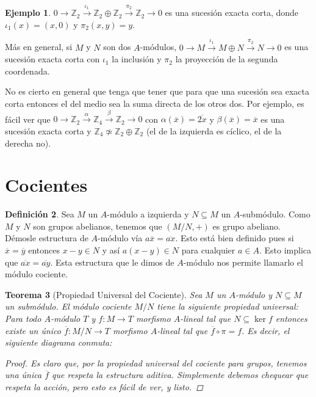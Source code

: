 \documentclass[12pt]{book}
\newtheorem{teo}{Teorema}[section]
\theoremstyle{definition}
\newtheorem{defn}[teo]{Definición}
\newtheorem{ex}[teo]{Ejemplo}
\newcommand{\ZZ}{\mathbb{Z}}      %
\begin{document}
\begin{ex}
$0\longrightarrow \ZZ_2 \stackrel{\iota_1}{\longrightarrow} \ZZ_2 \oplus \ZZ_2 \stackrel{\pi_2}{\longrightarrow} \ZZ_2\longrightarrow 0$ es una sucesión exacta corta, donde $\iota_1(x) = (x,0)$ y $\pi_2(x,y)=y$.

Más en general, si $M$ y $N$ son dos $A$-módulos, $0\longrightarrow M\stackrel{\iota_1}{\longrightarrow} M\oplus N\stackrel{\pi_2}{\longrightarrow} N\longrightarrow 0$ es una sucesión exacta corta con $\iota_1$ la inclusión y $\pi_2$ la proyección de la segunda coordenada.

No es cierto en general que tenga que tener que para que una sucesión sea exacta corta entonces el del medio sea la suma directa de los otros dos. Por ejemplo, es fácil ver que $0\longrightarrow \ZZ_2\stackrel{\alpha}{\longrightarrow} \ZZ_4 \stackrel{\beta}{\longrightarrow} \ZZ_2\longrightarrow 0$ con $\alpha(\overline{x})=\overline{2x}$ y $\beta(\overline{x})=\overline{x}$ es una sucesión exacta corta y $\ZZ_4\not\simeq \ZZ_2\oplus\ZZ_2$ (el de la izquierda es cíclico, el de la derecha no).
\end{ex}

\section{Cocientes}

\begin{defn}
Sea $M$ un $A$-módulo a izquierda y $N\subseteq M$ un $A$-submódulo. Como $M$ y $N$ son grupos abelianos, tenemos que $(M/N,+)$ es grupo abeliano. Démosle estructura de $A$-módulo vía $a\overline{x} = \overline{ax}$. Esto está bien definido pues si $\overline{x}=\overline{y}$ entonces $x-y\in N$ y así $a(x-y)\in N$ para cualquier $a\in A$. Esto implica que $\overline{ax}=\overline{ay}$. Esta estructura que le dimos de $A$-módulo nos permite llamarlo el módulo cociente.
\end{defn}

\begin{teo}[Propiedad Universal del Cociente]
Sea $M$ un $A$-módulo y $N\subseteq M$ un submódulo. El módulo cociente $M/N$ tiene la siguiente propiedad universal:
Para todo $A$-módulo $T$ y $f:M\to T$ morfismo $A$-lineal tal que $N\subseteq \ker f$ entonces existe un único $\overline{f}:M/N\to T$ morfismo $A$-lineal tal que $\overline{f}\circ \pi = f$. Es decir, el siguiente diagrama conmuta: 
\begin{proof}
Es claro que, por la propiedad universal del cociente para grupos, tenemos una única $\overline{f}$ que respeta la estructura aditiva. Simplemente debemos chequear que respeta la acción, pero esto es fácil de ver, y listo.
\end{proof}
\end{teo}
\end{document}
